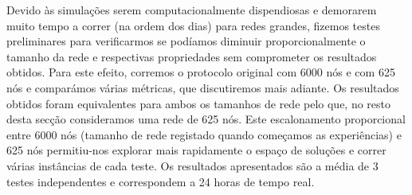 





Devido às simulações serem computacionalmente dispendiosas e demorarem muito tempo a correr (na ordem dos dias) para redes grandes, fizemos testes preliminares para verificarmos se podíamos diminuir proporcionalmente o tamanho da rede e respectivas propriedades sem comprometer os resultados obtidos.
Para este efeito, corremos o protocolo original com 6000 nós e com 625 nós e comparámos várias métricas, que discutiremos mais adiante.
Os resultados obtidos foram equivalentes para ambos os tamanhos de rede pelo que, no resto desta secção consideramos uma rede de 625 nós.
Este escalonamento proporcional entre 6000 nós (tamanho de rede registado quando começamos as experiências) e 625 nós permitiu-nos explorar mais rapidamente o espaço de soluções e correr várias instâncias de cada teste.
Os resultados apresentados são a média de 3 testes independentes e correspondem a 24 horas de tempo real.


